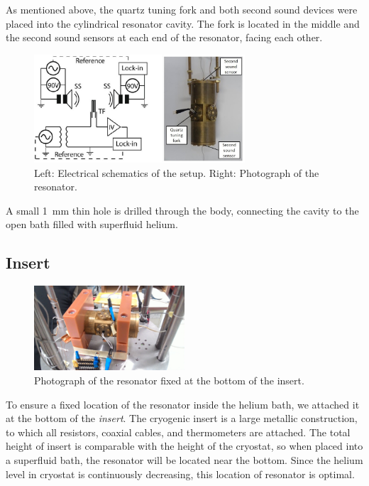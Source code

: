 As mentioned above, the quartz tuning fork and both second sound devices were placed into the cylindrical resonator cavity. The fork is located in the middle and the second sound sensors at each end of the resonator, facing each other.

\begin{figure}[h]
	\centering
	\includegraphics[width=0.7\textwidth]{graphics/setup}
	\caption{Left: Electrical schematics of the setup. Right: Photograph of the resonator.}
\end{figure}

A small 1~mm thin hole is drilled through the body, connecting the cavity to the open bath filled with superfluid helium.

\subsection*{Insert}

\begin{figure}
	\centering
	\vspace{-0.5cm}
	\includegraphics[width=0.5\textwidth]{graphics/photo_insert2}
	\caption{Photograph of the resonator fixed at the bottom of the insert.}
	\vspace{0cm}
\end{figure}

To ensure a fixed location of the resonator inside the helium bath, we attached it at the bottom of the \textit{insert}. The cryogenic insert is a large metallic construction, to which all resistors, coaxial cables, and thermometers are attached. The total height of insert is comparable with the height of the cryostat, so when placed into a superfluid bath, the resonator will be located near the bottom. Since the helium level in cryostat is continuously decreasing, this location of resonator is optimal.


